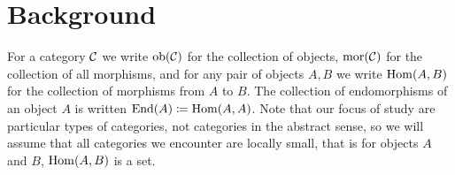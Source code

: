 \chapter{Background}

For a category $\mathcal{C}$ we write $\operatorname{ob}(\mathcal{C})$ for the collection of objects, $\operatorname{mor}(\mathcal{C})$ for the collection of all morphisms, and for any pair of objects $A,B$ we write $\operatorname{Hom}(A,B)$ for the collection of morphisms from $A$ to $B$. The collection of endomorphisms of an object $A$ is written $\operatorname{End}(A) \coloneqq \operatorname{Hom}(A,A)$. Note that our focus of study are particular types of categories, not categories in the abstract sense, so we will assume that all categories we encounter are locally small, that is for objects $A$ and $B$, $\operatorname{Hom}(A,B)$ is a set.






